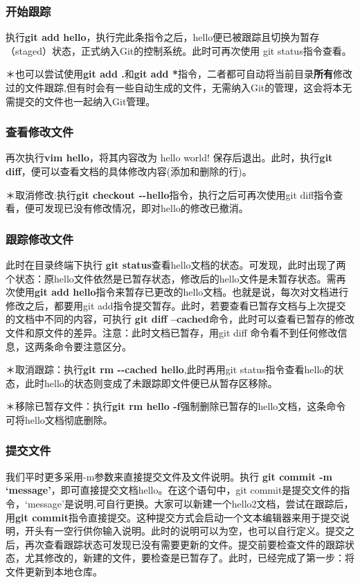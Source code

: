\documentclass{article}
\begin{document}
\subsubsection{开始跟踪}
执行\textbf{git add hello}，执行完此条指令之后，hello便已被跟踪且切换为暂存（staged）状态，正式纳入Git的控制系统。此时可再次使用 git status指令查看。

＊也可以尝试使用\textbf{git add .}和\textbf{git add  *}指令，二者都可自动将当前目录\textbf{所有}修改过的文件跟踪,但有时会有一些自动生成的文件，无需纳入Git的管理，这会将本无需提交的文件也一起纳入Git管理。
\subsubsection{查看修改文件}
再次执行\textbf{vim hello}，将其内容改为 hello world! 保存后退出。此时，执行\textbf{git diff}，便可以查看文档的具体修改内容(添加和删除的行)。

＊取消修改:执行\textbf{git checkout {-}{-}hello}指令，执行之后可再次使用git diff指令查看，便可发现已没有修改情况，即对hello的修改已撤消。
\subsubsection{跟踪修改文件}
此时在目录终端下执行 \textbf{git status}查看hello文档的状态。可发现，此时出现了两个状态：原hello文件依然是已暂存状态，修改后的hello文件是未暂存状态。需再次使用\textbf{git add hello}指令来暂存已更改的hello文档。也就是说，每次对文档进行修改之后，都要用git add指令提交暂存。此时，若要查看已暂存文档与上次提交的文档中不同的内容，可执行 \textbf{git diff --cached}命令，此时可以查看已暂存的修改文件和原文件的差异。注意：此时文档已暂存，用git diff 命令看不到任何修改信息，这两条命令要注意区分。

＊取消跟踪：执行\textbf{git rm {-}{-}cached hello},此时再用git status指令查看hello的状态，此时hello的状态则变成了未跟踪即文件便已从暂存区移除。

＊移除已暂存文件：执行\textbf{git rm hello -f}强制删除已暂存的hello文档，这条命令可将hello文档彻底删除。
\subsubsection{提交文件}
我们平时更多采用-m参数来直接提交文件及文件说明。执行 \textbf{git commit -m `message'}，即可直接提交文档hello。在这个语句中，git commit是提交文件的指令，`message'是说明,可自行更换。大家可以新建一个hello2文档，尝试在跟踪后，用\textbf{git commit}指令直接提交。这种提交方式会启动一个文本编辑器来用于提交说明，开头有一空行供你输入说明。此时的说明可以为空，也可以自行定义。提交之后，再次查看跟踪状态可发现已没有需要更新的文件。提交前要检查文件的跟踪状态，尤其修改的，新建的文件，要检查是已暂存了。此时，已经完成了第一步：将文件更新到本地仓库。
\end{document}
